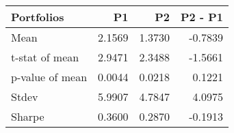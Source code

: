 \begin{tabular}{lrrr}
\toprule
Portfolios & P1 & P2 & P2 - P1 \\
\midrule
Mean & 2.1569 & 1.3730 & -0.7839 \\
t-stat of mean & 2.9471 & 2.3488 & -1.5661 \\
p-value of mean & 0.0044 & 0.0218 & 0.1221 \\
Stdev & 5.9907 & 4.7847 & 4.0975 \\
Sharpe & 0.3600 & 0.2870 & -0.1913 \\
\bottomrule
\end{tabular}
